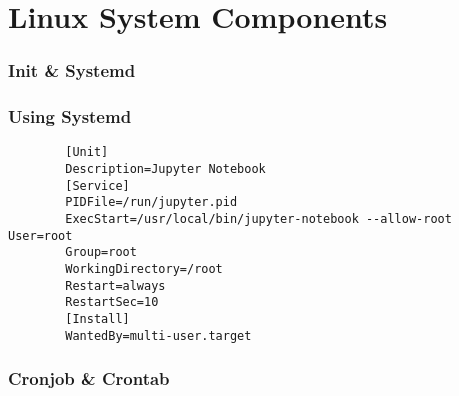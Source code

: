 \section{Linux System Components}

\begin{frame}
    \frametitle{Init \& Systemd}



\end{frame}

\begin{frame}[fragile]
    \frametitle{Using Systemd}

    \begin{lstlisting}
        [Unit]
        Description=Jupyter Notebook 
        [Service]
        PIDFile=/run/jupyter.pid 
        ExecStart=/usr/local/bin/jupyter-notebook --allow-root User=root
        Group=root
        WorkingDirectory=/root
        Restart=always
        RestartSec=10
        [Install]
        WantedBy=multi-user.target
    \end{lstlisting}

\end{frame}


\begin{frame}
    \frametitle{Cronjob \& Crontab}



\end{frame}